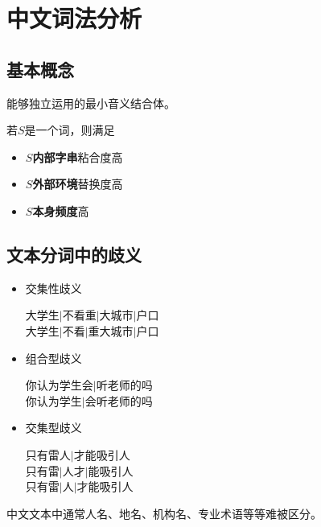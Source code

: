 
\section{中文词法分析}
\subsection{基本概念}
\begin{definition}[词]
能够独立运用的最小音义结合体。
\end{definition}

若$S$是一个词，则满足
\begin{itemize}
\item $S$\textbf{内部字串}粘合度高
\item $S$\textbf{外部环境}替换度高
\item $S$\textbf{本身频度}高
\end{itemize}

\subsection{文本分词中的歧义}
\begin{itemize}
	\item 交集性歧义
\begin{displayquote}
大学生$\mid$不看重$\mid$大城市$\mid$户口\\
大学生$\mid$不看$\mid$重大城市$\mid$户口\\
\end{displayquote}
	\item 组合型歧义
\begin{displayquote}
你认为学生会$\mid$听老师的吗\\
你认为学生$\mid$会听老师的吗\\
\end{displayquote}
	\item 交集型歧义
\begin{displayquote}
只有雷人$\mid$才能吸引人\\
只有雷$\mid$人才$\mid$能吸引人\\
只有雷$\mid$人$\mid$才能吸引人
\end{displayquote}
\end{itemize}

中文文本中通常人名、地名、机构名、专业术语等等难被区分。

